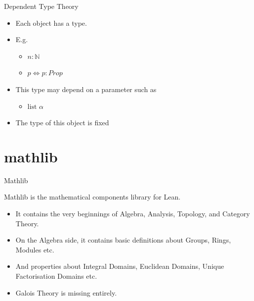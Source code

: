 \documentclass{beamer}
\newcommand{\N}{\mathbb{N}}
\begin{document}
\begin{frame}{Dependent Type Theory}
  \begin{itemize}
    \item Each object has a type. 
    \item E.g. 
      \begin{itemize}
        \item $n : \N$
        \item $p \iff  p : Prop$
      \end{itemize}

    \item This type may depend on a parameter such as 
    
    \begin{itemize}
      \item $\text{list } \alpha$
    \end{itemize}



    \item The type of this object is fixed %


  \end{itemize}

\end{frame}


\section {mathlib}

\begin{frame}{Mathlib}

  Mathlib is the mathematical components library for Lean. 
  \begin{itemize}
    \item It contains the very beginnings of Algebra, Analysis, Topology, and Category Theory. 
    \item On the Algebra side, it contains basic definitions about Groups, Rings, Modules etc. 
    \item And properties about Integral Domains, Euclidean Domains, Unique Factorisation Domains etc. 
    \item Galois Theory is missing entirely.  
  \end{itemize}


\end{frame}
\end{document}
